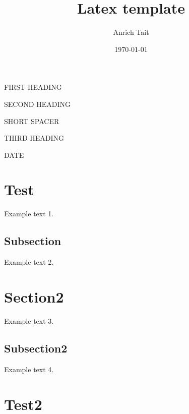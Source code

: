 \documentclass[a4paper]{article}
\author{Anrich Tait}
\date{\today}
\title{Latex template}
\begin{document}
\clearpage

\begin{titlepage}
\begin{center}
{\Large FIRST HEADING \par}
\vspace{2cm}
{\Large SECOND HEADING \par}
\vspace{2cm}
SHORT SPACER \par
\vspace{2cm}
{\Large THIRD HEADING \par}
\vspace{2cm}
{\large DATE}
\end{center}
\vfill
\end{titlepage}

\tableofcontents
\clearpage

\section{Test}
Example text 1.

\subsection{Subsection}
Example text 2.
\newpage

\section{Section2}
Example text 3.

\subsection{Subsection2}
Example text 4.
\newpage

\section{Test2}
\end{document}
